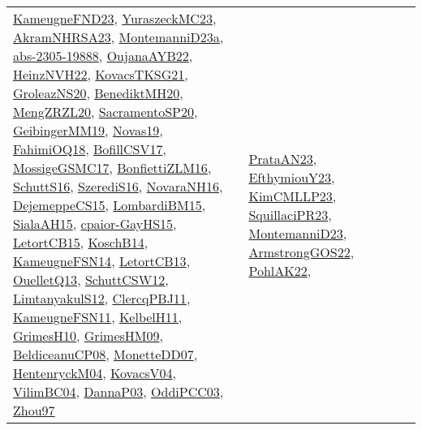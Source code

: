 {\begin{longtable}{llp{6cm}p{6cm}p{6cm}}
\href{papers/KameugneFND23.pdf}{KameugneFND23}\cite{KameugneFND23}, \href{papers/YuraszeckMC23.pdf}{YuraszeckMC23}\cite{YuraszeckMC23}, \href{articles/AkramNHRSA23.pdf}{AkramNHRSA23}\cite{AkramNHRSA23}, \href{articles/MontemanniD23a.pdf}{MontemanniD23a}\cite{MontemanniD23a}, \href{articles/abs-2305-19888.pdf}{abs-2305-19888}\cite{abs-2305-19888}, \href{papers/OujanaAYB22.pdf}{OujanaAYB22}\cite{OujanaAYB22}, \href{articles/HeinzNVH22.pdf}{HeinzNVH22}\cite{HeinzNVH22}, \href{papers/KovacsTKSG21.pdf}{KovacsTKSG21}\cite{KovacsTKSG21}, \href{papers/GroleazNS20.pdf}{GroleazNS20}\cite{GroleazNS20}, \href{articles/BenediktMH20.pdf}{BenediktMH20}\cite{BenediktMH20}, \href{articles/MengZRZL20.pdf}{MengZRZL20}\cite{MengZRZL20}, \href{articles/SacramentoSP20.pdf}{SacramentoSP20}\cite{SacramentoSP20}, \href{papers/GeibingerMM19.pdf}{GeibingerMM19}\cite{GeibingerMM19}, \href{articles/Novas19.pdf}{Novas19}\cite{Novas19}, \href{articles/FahimiOQ18.pdf}{FahimiOQ18}\cite{FahimiOQ18}, \href{papers/BofillCSV17.pdf}{BofillCSV17}\cite{BofillCSV17}, \href{papers/MossigeGSMC17.pdf}{MossigeGSMC17}\cite{MossigeGSMC17}, \href{papers/BonfiettiZLM16.pdf}{BonfiettiZLM16}\cite{BonfiettiZLM16}, \href{papers/SchuttS16.pdf}{SchuttS16}\cite{SchuttS16}, \href{papers/SzerediS16.pdf}{SzerediS16}\cite{SzerediS16}, \href{articles/NovaraNH16.pdf}{NovaraNH16}\cite{NovaraNH16}, \href{papers/DejemeppeCS15.pdf}{DejemeppeCS15}\cite{DejemeppeCS15}, \href{papers/LombardiBM15.pdf}{LombardiBM15}\cite{LombardiBM15}, \href{papers/SialaAH15.pdf}{SialaAH15}\cite{SialaAH15}, \href{papers/cpaior-GayHS15.pdf}{cpaior-GayHS15}\cite{cpaior-GayHS15}, \href{articles/LetortCB15.pdf}{LetortCB15}\cite{LetortCB15}, \href{papers/KoschB14.pdf}{KoschB14}\cite{KoschB14}, \href{articles/KameugneFSN14.pdf}{KameugneFSN14}\cite{KameugneFSN14}, \href{papers/LetortCB13.pdf}{LetortCB13}\cite{LetortCB13}, \href{papers/OuelletQ13.pdf}{OuelletQ13}\cite{OuelletQ13}, \href{papers/SchuttCSW12.pdf}{SchuttCSW12}\cite{SchuttCSW12}, \href{articles/LimtanyakulS12.pdf}{LimtanyakulS12}\cite{LimtanyakulS12}, \href{papers/ClercqPBJ11.pdf}{ClercqPBJ11}\cite{ClercqPBJ11}, \href{papers/KameugneFSN11.pdf}{KameugneFSN11}\cite{KameugneFSN11}, \href{articles/KelbelH11.pdf}{KelbelH11}\cite{KelbelH11}, \href{papers/GrimesH10.pdf}{GrimesH10}\cite{GrimesH10}, \href{papers/GrimesHM09.pdf}{GrimesHM09}\cite{GrimesHM09}, \href{papers/BeldiceanuCP08.pdf}{BeldiceanuCP08}\cite{BeldiceanuCP08}, \href{papers/MonetteDD07.pdf}{MonetteDD07}\cite{MonetteDD07}, \href{papers/HentenryckM04.pdf}{HentenryckM04}\cite{HentenryckM04}, \href{papers/KovacsV04.pdf}{KovacsV04}\cite{KovacsV04}, \href{papers/VilimBC04.pdf}{VilimBC04}\cite{VilimBC04}, \href{papers/DannaP03.pdf}{DannaP03}\cite{DannaP03}, \href{papers/OddiPCC03.pdf}{OddiPCC03}\cite{OddiPCC03}, \href{articles/Zhou97.pdf}{Zhou97}\cite{Zhou97} & \href{articles/PrataAN23.pdf}{PrataAN23}\cite{PrataAN23}, \href{papers/EfthymiouY23.pdf}{EfthymiouY23}\cite{EfthymiouY23}, \href{papers/KimCMLLP23.pdf}{KimCMLLP23}\cite{KimCMLLP23}, \href{papers/SquillaciPR23.pdf}{SquillaciPR23}\cite{SquillaciPR23}, \href{articles/MontemanniD23.pdf}{MontemanniD23}\cite{MontemanniD23}, \href{papers/ArmstrongGOS22.pdf}{ArmstrongGOS22}\cite{ArmstrongGOS22}, \href{articles/PohlAK22.pdf}{PohlAK22}\cite{PohlAK22}, 
\end{longtable}}
